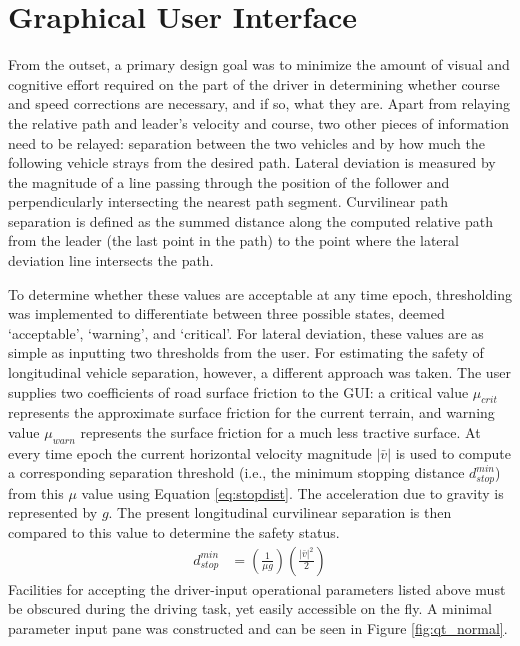 \documentclass[twocolumn,10pt]{article}
\begin{document}

\section*{Graphical User Interface}

  From the outset, a primary design goal was to minimize the amount of visual and cognitive effort required on the part of the driver in determining whether course and speed corrections are necessary, and if so, what they are.
  Apart from relaying the relative path and leader's velocity and course, two other pieces of information need to be relayed: separation between the two vehicles and by how much the following vehicle strays from the desired path.
  Lateral deviation is measured by the magnitude of a line passing through the position of the follower and perpendicularly intersecting the nearest path segment.
  Curvilinear path separation is defined as the summed distance along the computed relative path from the leader (the last point in the path) to the point where the lateral deviation line intersects the path.

  To determine whether these values are acceptable at any time epoch, thresholding was implemented to differentiate between three possible states, deemed `acceptable', `warning', and `critical'.
  For lateral deviation, these values are as simple as inputting two thresholds from the user.  For estimating the safety of longitudinal vehicle separation, however, a different approach was taken.  The user supplies two coefficients of road surface friction to the GUI: a critical value $\mu_{crit}$ represents the approximate surface friction for the current terrain, and warning value $\mu_{warn}$ represents the surface friction for a much less tractive surface.  At every time epoch the current horizontal velocity magnitude $|\bar{v}|$ is used to compute a corresponding separation threshold (i.e., the minimum stopping distance $d_{stop}^{min}$) from this $\mu$ value using Equation \ref{eq:stopdist}.  The acceleration due to gravity is represented by $g$.  The present longitudinal curvilinear separation is then compared to this value to determine the safety status.
  \begin{align} \label{eq:stopdist}
    d_{stop}^{min} &= \left( \frac {1} {\mu g} \right) \left(\frac {|\bar{v}|^2} {2} \right)
  \end{align}  %
  Facilities for accepting the driver-input operational parameters listed above must be obscured during the driving task, yet easily accessible on the fly.  A minimal parameter input pane was constructed and can be seen in Figure \ref{fig:qt_normal}.
\end{document}
